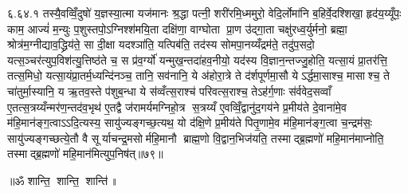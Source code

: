 ६.६४.१
तस्यै॒वव्विँ॒दुषो॑ य॒ज्ञस्या॒त्मा यज॑मानः श्र॒द्धा पत्नी॒ शरी॑रमि॒ध्ममुरो॒ वेदि॒र्लोमा॑नि ब॒\ar{}हिर्वे॒दश्शिखा॒ हृद॑य॒य्यूँपः॒ काम॒ आज्यं॑ म॒न्युः प॒शुस्तपो॒ऽग्निश्श॑मयि॒ता दक्षि॑णा॒ वाग्घोता प्रा॒ण उ॑द्गा॒ता चक्षु॑रध्व॒र्युर्मनो॒ ब्रह्मा॒ श्रोत्र॑म॒ग्नीद्याव॒द्ध्रिय॑ते॒ सा दी॒क्षा यदश्ञा॑ति॒ यत्पिब॑ति॒ तद॑स्य सोमपा॒नय्यँद्रम॑ते॒ तदु॑प॒सदो॒ यत्स॒ञ्चर॑त्युप॒विश॑त्यु॒त्तिष्ठ॑ते च॒ स प्र॑व॒र्ग्यो॑ यन्मुख॒न्तदा॑हव॒नीयो॒ यद॑स्य वि॒ज्ञान॒न्तज्जु॒होति॒ यत्सा॒यं प्रा॒तर॑त्ति॒ तत्स॒मिधो॒ यत्सा॒यंप्रा॒तर्म॒ध्यन्दि॑नञ्च॒ तानि॒ सव॑नानि॒ ये अ॑होरा॒त्रे ते द॑र्\mbox{}शपूर्णमा॒सौ येऽर्द्धमा॒साश्च॒ मासाश्च॒ ते चा॑तुर्मा॒स्यानि॒ य ऋ॒तव॒स्ते प॑शुब॒न्धा ये स॑व्वँत्स॒राश्च॑ परिवत्स॒राश्च॒ तेऽह॑र्ग॒णाः स॑र्ववेद॒सव्वाँ ए॒तत्स॒त्रय्यँन्मर॑ण॒न्तद॑व॒भृथ॑ ए॒तद्वै ज॑रामर्यमग्निहो॒त्र स॒त्रय्यँ ए॒वव्विँ॒द्वानु॑द॒गय॑ने प्र॒मीय॑ते दे॒वाना॑मे॒व म॑हि॒मान॑ङ्ग॒त्वाऽऽदि॒त्यस्य॒ सायु॑ज्यङ्गच्छ॒त्यथ॒ यो द॑क्षि॒णे प्र॒मीय॑ते पितृ॒णामे॒व म॑हि॒मान॑ङ्ग॒त्वा च॒न्द्रम॑सः॒ सायु॑ज्यङ्गच्छत्ये॒तौ वै सूर्याचन्द्र॒मसोर्महि॒मानौ ब्राह्म॒णो वि॒द्वान॒भिज॑यति॒ तस्माद्ब्र॒ह्मणो॑ महि॒मान॑माप्नोति॒ तस्माद्ब्र॒ह्मणो॑ महि॒मान॑मित्युप॒निष॑त्॥७९॥
\anuvakamend

\centerline{॥ॐ शान्ति॒ शान्ति॒ शान्ति॑॥}
